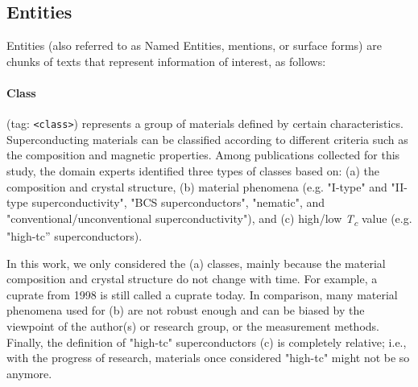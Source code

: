 \subsection{Entities}
Entities (also referred to as Named Entities, mentions, or surface forms) are chunks of texts that represent information of interest, as follows: 

\paragraph{Class} (tag: \texttt{<class>}) represents a group of materials defined by certain characteristics.
Superconducting materials can be classified according to different criteria such as the composition and magnetic properties. 
Among publications collected for this study, the domain experts identified three types of classes based on: (a) the composition and crystal structure, (b) material phenomena (e.g. "I-type" and "II-type superconductivity", "BCS superconductors", "nematic", and "conventional/unconventional superconductivity"), and (c) high/low \textit{T\textsubscript{c}} value (e.g. "high-tc” superconductors). 

In this work, we only considered the (a) classes, mainly because the material composition and crystal structure do not change with time. For example, a cuprate from 1998 is still called a cuprate today. 
In comparison, many material phenomena used for (b) are not robust enough and can be biased by the viewpoint of the author(s) or research group, or the measurement methods. 
Finally, the definition of "high-tc" superconductors (c) is completely relative; i.e., with the progress of research, materials once considered "high-tc" might not be so anymore.

